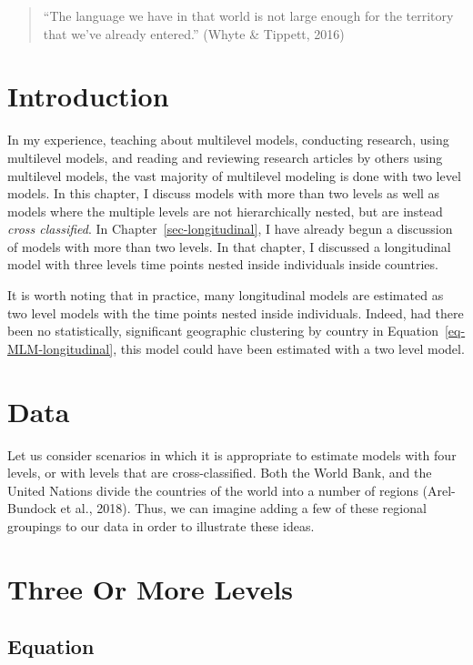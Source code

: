 \documentclass[
  letterpaper,
  DIV=11,
  numbers=noendperiod]{scrreprt}
\begin{document}
\begin{quote}
``The language we have in that world is not large enough for the
territory that we've already entered.'' (Whyte \& Tippett, 2016)
\end{quote}

\section{Introduction}\label{introduction-3}

In my experience, teaching about multilevel models, conducting research,
using multilevel models, and reading and reviewing research articles by
others using multilevel models, the vast majority of multilevel modeling
is done with two level models. In this chapter, I discuss models with
more than two levels as well as models where the multiple levels are not
hierarchically nested, but are instead \emph{cross classified}. In
Chapter~\ref{sec-longitudinal}, I have already begun a discussion of
models with more than two levels. In that chapter, I discussed a
longitudinal model with three levels time points nested inside
individuals inside countries.

It is worth noting that in practice, many longitudinal models are
estimated as two level models with the time points nested inside
individuals. Indeed, had there been no statistically, significant
geographic clustering by country in Equation~\ref{eq-MLM-longitudinal},
this model could have been estimated with a two level model.

\section{Data}\label{data}

Let us consider scenarios in which it is appropriate to estimate models
with four levels, or with levels that are cross-classified. Both the
World Bank, and the United Nations divide the countries of the world
into a number of regions (Arel-Bundock et al., 2018). Thus, we can
imagine adding a few of these regional groupings to our data in order to
illustrate these ideas.

\section{Three Or More Levels}\label{three-or-more-levels}

\subsection{Equation}\label{equation}
\end{document}
